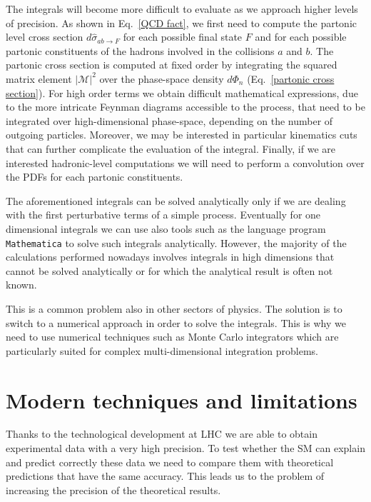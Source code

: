 \documentclass[../main/main.tex]{subfiles}
\begin{document}
The integrals will become more difficult to evaluate as we approach higher levels of precision. As shown in Eq.~\ref{QCD fact}, we first need to compute the partonic level cross section  $d\hat{\sigma}_{ab \rightarrow F}$ for each possible final state $F$ and for each possible partonic constituents of the hadrons involved in the collisions $a$ and $b$. The partonic cross section is computed at fixed order by integrating the squared matrix element $|\mathcal{M}|^2$ over the phase-space density $d\Phi_n$ (Eq.~\ref{partonic cross section}). For high order terms we obtain difficult mathematical expressions, due to the more intricate Feynman diagrams accessible to the process, that need to be integrated over high-dimensional phase-space, depending on the number of outgoing particles. Moreover, we may be interested in particular kinematics cuts that can further complicate the evaluation of the integral. Finally, if we are interested hadronic-level computations we will need to perform a convolution over the PDFs for each partonic constituents.

The aforementioned integrals can be solved analytically only if we are dealing with the first perturbative terms of a simple process. Eventually for one dimensional integrals we can use also tools such as the language program \texttt{Mathematica} \cite{Mathematica} to solve such integrals analytically. However, the majority of the calculations performed nowadays involves integrals in high dimensions that cannot be solved analytically or for which the analytical result is often not known.

This is a common problem also in other sectors of physics. The solution is to switch to a numerical approach in order to solve the integrals. This is why we need to use numerical techniques such as Monte Carlo integrators which are particularly suited for complex multi-dimensional integration problems.  



\section{Modern techniques and limitations}

Thanks to the technological development at LHC we are able to obtain experimental data with a very high precision. To test whether 
the SM can explain and predict correctly these data we need to compare them with  theoretical predictions that have the same accuracy.
This leads us to the problem of increasing the precision of the theoretical results. 
\end{document}
